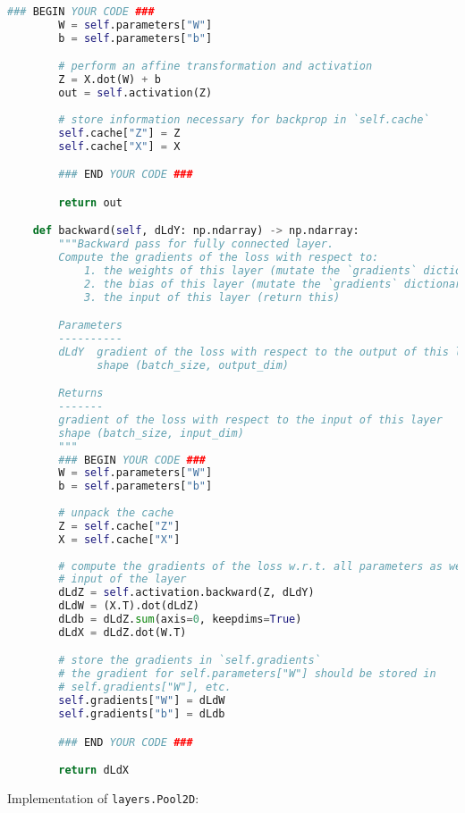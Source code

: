 \begin{lstlisting}[language=Python]
        ### BEGIN YOUR CODE ###
        W = self.parameters["W"]
        b = self.parameters["b"]

        # perform an affine transformation and activation
        Z = X.dot(W) + b
        out = self.activation(Z)
        
        # store information necessary for backprop in `self.cache`
        self.cache["Z"] = Z
        self.cache["X"] = X

        ### END YOUR CODE ###

        return out

    def backward(self, dLdY: np.ndarray) -> np.ndarray:
        """Backward pass for fully connected layer.
        Compute the gradients of the loss with respect to:
            1. the weights of this layer (mutate the `gradients` dictionary)
            2. the bias of this layer (mutate the `gradients` dictionary)
            3. the input of this layer (return this)

        Parameters
        ----------
        dLdY  gradient of the loss with respect to the output of this layer
              shape (batch_size, output_dim)

        Returns
        -------
        gradient of the loss with respect to the input of this layer
        shape (batch_size, input_dim)
        """
        ### BEGIN YOUR CODE ###
        W = self.parameters["W"]
        b = self.parameters["b"]
        
        # unpack the cache
        Z = self.cache["Z"]
        X = self.cache["X"]
        
        # compute the gradients of the loss w.r.t. all parameters as well as the
        # input of the layer
        dLdZ = self.activation.backward(Z, dLdY)
        dLdW = (X.T).dot(dLdZ)
        dLdb = dLdZ.sum(axis=0, keepdims=True)
        dLdX = dLdZ.dot(W.T)

        # store the gradients in `self.gradients`
        # the gradient for self.parameters["W"] should be stored in
        # self.gradients["W"], etc.
        self.gradients["W"] = dLdW
        self.gradients["b"] = dLdb

        ### END YOUR CODE ###

        return dLdX

\end{lstlisting}

Implementation of \texttt{layers.Pool2D}:


